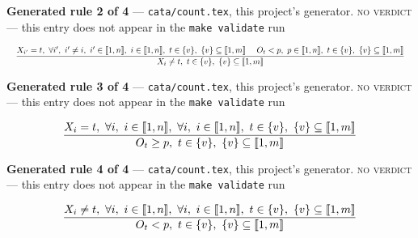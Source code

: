 \documentclass[10pt,a4paper]{article}
\newcommand{\rulebox}[1]{%
  \[\resizebox{\ifdim\width>\linewidth\linewidth\else\width\fi}{!}%
    {$\displaystyle #1$}\]}
\begin{document}
{\small\textbf{Generated rule 2 of 4} --- \texttt{cata/count.tex}, this project's generator. \textsc{no verdict} --- this entry does not appear in the \texttt{make validate} run\par}
\rulebox{\frac{X_{i'}=t,~\forall i',~i' \neq i,~i' \in \llbracket1,n\rrbracket,~i \in \llbracket1,n\rrbracket,~t \in \{v\},~\{v\} \subseteq \llbracket1,m\rrbracket~~~~O_{t}<p,~p \in \llbracket1,n\rrbracket,~t \in \{v\},~\{v\} \subseteq \llbracket1,m\rrbracket}{X_{i} \neq t,~t \in \{v\},~\{v\} \subseteq \llbracket1,m\rrbracket}}

{\small\textbf{Generated rule 3 of 4} --- \texttt{cata/count.tex}, this project's generator. \textsc{no verdict} --- this entry does not appear in the \texttt{make validate} run\par}
\rulebox{\frac{X_{i}=t,~\forall i,~i \in \llbracket1,n\rrbracket,~\forall i,~i \in \llbracket1,n\rrbracket,~t \in \{v\},~\{v\} \subseteq \llbracket1,m\rrbracket}{O_{t} \geq p,~t \in \{v\},~\{v\} \subseteq \llbracket1,m\rrbracket}}

{\small\textbf{Generated rule 4 of 4} --- \texttt{cata/count.tex}, this project's generator. \textsc{no verdict} --- this entry does not appear in the \texttt{make validate} run\par}
\rulebox{\frac{X_{i} \neq t,~\forall i,~i \in \llbracket1,n\rrbracket,~\forall i,~i \in \llbracket1,n\rrbracket,~t \in \{v\},~\{v\} \subseteq \llbracket1,m\rrbracket}{O_{t}<p,~t \in \{v\},~\{v\} \subseteq \llbracket1,m\rrbracket}}
\end{document}
